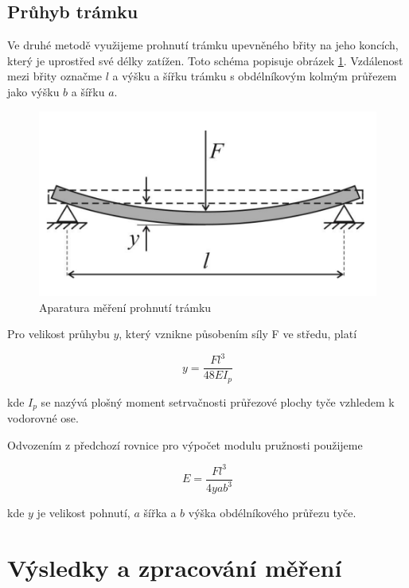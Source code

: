 \subsection{Průhyb trámku}

Ve druhé metodě využijeme prohnutí trámku upevněného břity na jeho koncích, který je uprostřed své délky zatížen. Toto schéma popisuje obrázek \ref{fig:aparatura-prohnuti-tramku}. Vzdálenost mezi břity označme \(l\) a výšku a šířku trámku s obdélníkovým kolmým průřezem jako výšku \(b\) a šířku \(a\).

\begin{figure}[h]
    \centering
    \includegraphics[width=0.5\linewidth]{09 - Měření modulu pružnosti v tahu//Protokol_modul pružnosti//img/Aparatura_průhyb trámku.png}
    \caption{Aparatura měření prohnutí trámku}
    \label{fig:aparatura-prohnuti-tramku}
\end{figure}

Pro velikost průhybu \(y\), který vznikne působením síly F ve středu, platí

\begin{equation}
    y = \frac{F l^3}{48 E I_p}
\end{equation}

kde \(I_p\) se nazývá plošný moment setrvačnosti průřezové plochy tyče vzhledem k vodorovné ose.

Odvozením z předchozí rovnice pro výpočet modulu pružnosti použijeme

\begin{equation}
    E = \frac{F l^3}{4 y a b^3}
\end{equation}

kde \(y\) je velikost pohnutí, \(a\) šířka a \(b\) výška obdélníkového průřezu tyče.

\section{Výsledky a zpracování měření}

